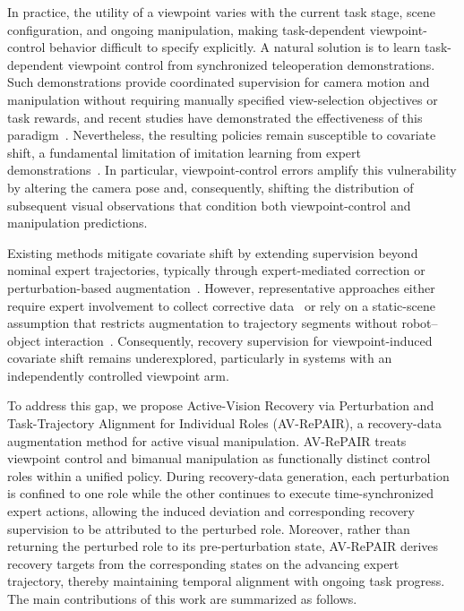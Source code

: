 \documentclass[letterpaper, 10 pt, conference]{ieeeconf}  %
\begin{document}
In practice, the utility of a viewpoint varies with the current task stage, scene configuration, and ongoing manipulation, making task-dependent viewpoint-control behavior difficult to specify explicitly.
A natural solution is to learn task-dependent viewpoint control from synchronized teleoperation demonstrations. Such demonstrations provide coordinated supervision for camera motion and manipulation without requiring manually specified view-selection objectives or task rewards, and recent studies have demonstrated the effectiveness of this paradigm~\cite{chuangActiveVisionMight2025,sunOptimizingActivePerception2025}.
Nevertheless, the resulting policies remain susceptible to covariate shift, a fundamental limitation of imitation learning from expert demonstrations~\cite{spencerFeedbackImitationLearning2021}. 
In particular, viewpoint-control errors amplify this vulnerability by altering the camera pose and, consequently, shifting the distribution of subsequent visual observations that condition both viewpoint-control and manipulation predictions.


Existing methods mitigate covariate shift by extending supervision beyond nominal expert trajectories, typically through expert-mediated correction or perturbation-based augmentation~\cite{tsujiSurveyImitationLearning2026}. However, representative approaches either require expert involvement to collect corrective data~\cite{rossReductionImitationLearning,laskeyDARTNoiseInjection} or rely on a static-scene assumption that restricts augmentation to trajectory segments without robot--object interaction~\cite{zhouNeRFPalmYour2023a}. Consequently, recovery supervision for viewpoint-induced covariate shift remains underexplored, particularly in systems with an independently controlled viewpoint arm.

To address this gap, we propose Active-Vision Recovery via Perturbation and Task-Trajectory Alignment for Individual Roles (AV-RePAIR), a recovery-data augmentation method for active visual manipulation. 
AV-RePAIR treats viewpoint control and bimanual manipulation as functionally distinct control roles within a unified policy. During recovery-data generation, each perturbation is confined to one role while the other continues to execute time-synchronized expert actions, allowing the induced deviation and corresponding recovery supervision to be attributed to the perturbed role. Moreover, rather than returning the perturbed role to its pre-perturbation state, AV-RePAIR derives recovery targets from the corresponding states on the advancing expert trajectory, thereby maintaining temporal alignment with ongoing task progress.
The main contributions of this work are summarized as follows.
\end{document}
